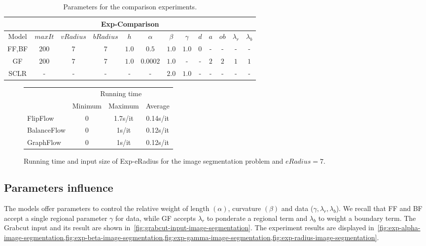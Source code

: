 \begin{table}
\centering
\begin{tabular}{|c|c|c|c|c|c|c|c|c|c|c|c|c|}
\hline
\multicolumn{13}{|c|}{Exp-Comparison}\\
\hline
Model & $maxIt$ & $vRadius$ & $bRadius$ & $h$ & $\alpha$ & $\beta$  & $\gamma$ & $d$ & $a$ & $ob$ & $\lambda_r$ & $\lambda_b$ \\
\hline
FF,BF & $200$ & $7$ & $7$ & $1.0$ & $0.5$ & $1.0$ & $1.0$ & $0$ & - & - & - & -\\
\hline
GF & $200$ & $7$ & $7$ & $1.0$ & $0.0002$ & $1.0$ & - & - & $2$ & $2$ & $1$ & $1$\\
\hline
SCLR & - & - & - & - & - & $2.0$ & $1.0$ & - & - & - & - & -\\
\hline
\end{tabular}
\caption{Parameters for the comparison experiments.}
\label{tab:image-segmentation-comparison-summary}
\end{table}

\begin{figure}
\center
\captionsetup{type=table}
\begin{tabular}{|l|c|c|c|}
\hline
& \multicolumn{3}{|c|}{Running time}\\
& Minimum & Maximum & Average \\
\hline
FlipFlow & 0 & 1.7s/it & 0.14s/it\\
BalanceFlow & 0 & 1s/it & 0.12s/it\\
GraphFlow & 0 & 1s/it & 0.12s/it\\
\hline
\end{tabular}
\caption{Running time and input size of Exp-eRadius for the image segmentation problem and $eRadius=7$.}
\label{tab:rtime-image-segmentation-general} 
\end{figure}

\subsection{Parameters influence}
The models offer parameters to control the relative weight of length $(\alpha)$, curvature $(\beta)$ and data ($\gamma,\lambda _r, \lambda _b$). We recall that FF and BF accept a single regional parameter $\gamma$ for data, while GF accepts $\lambda _r$ to ponderate a regional term and $\lambda _b$ to weight a boundary term. The Grabcut input and its result are shown in~\cref{fig:grabcut-input-image-segmentation}. The experiment results are displayed in~\cref{fig:exp-alpha-image-segmentation,fig:exp-beta-image-segmentation,fig:exp-gamma-image-segmentation,fig:exp-radius-image-segmentation}. 

